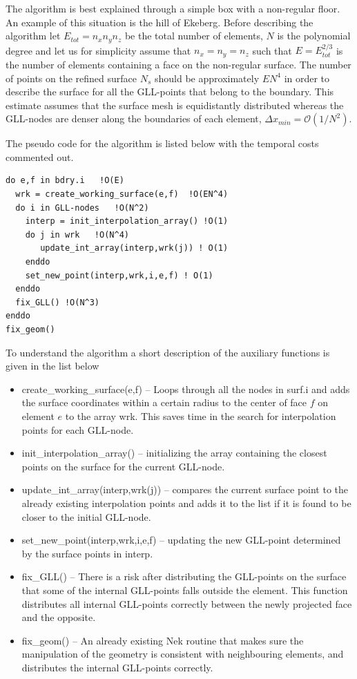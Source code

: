The algorithm is best explained through a simple box with a non-regular floor. 
An example of this situation is the hill of Ekeberg. 
Before describing the algorithm let $E_{tot} = n_xn_yn_z$  be the total number of elements, 
$N$ is the polynomial degree and let us for simplicity assume that $n_x=n_y=n_z$ such that 
$E= E_{tot}^{2/3}$ is the number of elements containing a face on the non-regular surface.
The number of points on the refined surface $N_s$ should be approximately $EN^4$ in 
order to describe the surface for all the GLL-points that belong to the boundary. This estimate
assumes that the surface mesh is equidistantly distributed whereas the GLL-nodes 
are denser along the boundaries of each element, $\Delta x_{min} = \mathcal{O}(1/N^2)$. 

The pseudo code for the algorithm is listed below with the temporal costs commented out.
%
\begingroup
\fontsize{12pt}{14pt}
\begin{lstlisting}[escapechar=|,frame=none]
do e,f in bdry.i   !O(E)
  wrk = create_working_surface(e,f)  !O(EN^4) 
  do i in GLL-nodes   !O(N^2)
    interp = init_interpolation_array() !O(1) 
    do j in wrk   !O(N^4)
       update_int_array(interp,wrk(j)) ! O(1)
    enddo
    set_new_point(interp,wrk,i,e,f) ! O(1)
  enddo
  fix_GLL() !O(N^3)
enddo
fix_geom()
\end{lstlisting}
\endgroup
% 
To understand the algorithm a short description of the auxiliary functions is 
given in the list below
\begin{itemize}
    \item create\_working\_surface(e,f) -- Loops through all the nodes in surf.i and adds the 
        surface coordinates within a certain radius to the center of face $f$ on element $e$ to the array wrk.
        This saves time in the search for interpolation points for each GLL-node.
    \item init\_interpolation\_array() -- initializing the array containing the closest 
        points on the surface for the current GLL-node. 
    \item update\_int\_array(interp,wrk(j)) -- compares the current surface point to the 
        already existing interpolation points and adds it to the list if it is found to 
        be closer to the initial GLL-node.
    \item set\_new\_point(interp,wrk,i,e,f) -- updating the new GLL-point determined by the 
        surface points in interp.
    \item fix\_GLL() -- There is a risk after distributing the GLL-points on the surface that
        some of the internal GLL-points falls outside the element. This function distributes 
        all internal GLL-points correctly between the newly projected face and the opposite.
    \item fix\_geom() -- An already existing Nek routine that makes sure the manipulation of the 
        geometry is consistent with neighbouring elements, and distributes the internal GLL-points correctly.
\end{itemize}

